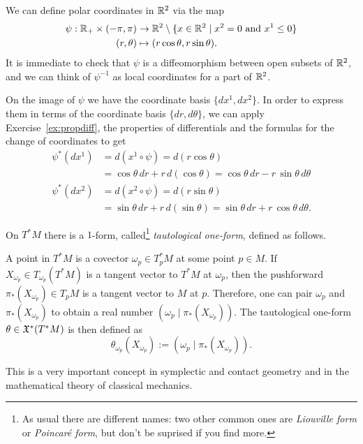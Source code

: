 \begin{example}
  We can define polar coordinates in $\mathbb{R}^2$ via the map
  \begin{align}
    \psi : \mathbb{R}_+\times (-\pi, \pi) &\to \mathbb{R}^2\setminus\{x\in\mathbb{R}^2\mid x^2=0 \mbox{ and } x^1 \leq 0\}\\
    (r, \theta) &\mapsto (r\cos\theta, r\sin\theta).
  \end{align}
  It is immediate to check that $\psi$ is a diffeomorphism between open subsets of $\mathbb{R}^2$, and we can think of $\psi^{-1}$ as local coordinates for a part of $\mathbb{R}^2$.

  On the image of $\psi$ we have the coordinate basis $\{dx^1, dx^2\}$. In order to express them in terms of the coordinate basis $\{dr,d\theta\}$, we can apply Exercise~\ref{ex:propdiff}, the properties of differentials and the formulas for the change of coordinates to get
  \begin{align}
    \psi^*(d x^1) &= d(x^1\circ \psi) = d(r\cos\theta) \\
    &= \cos\theta \,dr +r\,d(\cos\theta) = \cos\theta \,dr -r\,\sin\theta\,d\theta\\
    \psi^*(d x^2) &= d(x^2\circ \psi) = d(r\sin\theta) \\
    &= \sin\theta \,dr +r\,d(\sin\theta) = \sin\theta \,dr +r\,\cos\theta\,d\theta.
  \end{align}
\end{example}

\begin{example}
  On $T^*M$ there is a $1$-form, called\footnote{As usual there are different names: two other common ones are \emph{Liouville form} or \emph{Poincar\'e form}, but don't be suprised if you find more.} \emph{tautological one-form}, defined as follows.

  A point in $T^*M$ is a covector $\omega_p\in T^*_p M$ at some point $p\in M$. If $X_{\omega_p}\in T_{\omega_p}(T^*M)$ is a tangent vector to $T^*M$ at $\omega_p$, then the pushforward $\pi_*(X_{\omega_p})\in T_p M$ is a tangent vector to $M$ at $p$.
  Therefore, one can pair $\omega_p$ and $\pi_*(X_{\omega_p})$ to obtain a real number $\left(\omega_p\;\big|\;\pi_*(X_{\omega_p})\right)$.
  The tautological one-form $\theta\in\mathfrak{X}^*(T^*M)$ is then defined as
  \begin{equation}
    \theta_{\omega_p}(X_{\omega_p}) := \left(\omega_p\;\Big|\;\pi_*(X_{\omega_p})\right).
  \end{equation}

  This is a very important concept in symplectic and contact geometry and in the mathematical theory of classical mechanics.
\end{example}

